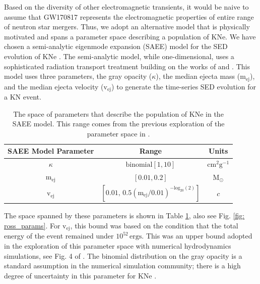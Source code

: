 Based on the diversity of other electromagnetic transients, it would be naive to assume that GW170817 represents the electromagnetic properties of entire range of neutron star mergers. Thus, we adopt an alternative model that is physically motivated and spans a parameter space describing a population of KNe. We have chosen a semi-analytic eigenmode expansion (SAEE) model for the SED evolution of KNe \citep{Rosswog2018}. The semi-analytic model, while one-dimensional, uses a sophisticated radiation transport treatment building on the works of \citet{Wollaeger2017} and \citet{Pinto2000}. This model uses three parameters, the gray opacity ($\kappa$), the median ejecta mass ($\mathrm{m_{ej}}$), and the median ejecta velocity ($\mathrm{v_{ej}}$) to generate the time-series SED evolution for a KN event.
\begin{table}[h!]
  \centering
  \begin{tabular}{c|c|c}
    SAEE Model Parameter & Range & Units \\
    \hline
    $\kappa$ & $\mathrm{binomial}[1, 10]$ & $\mathrm{cm^2 g^{-1}}$ \\
    \hline
    $\mathrm{m_{ej}}$ & $[0.01, 0.2]$ & $\mathrm{M_{\odot}}$ \\
    \hline
    $\mathrm{v_{ej}}$ & $[0.01, \, 0.5 (\mathrm{m_{ej}}/0.01)^{-\mathrm{log}_{20}(2)}]$ & $c$
  \end{tabular}
  \caption{The space of parameters that describe the population of KNe in the SAEE model. This range comes from the previous exploration of the parameter space in \citet{Rosswog2016a}.}
  \label{tab: ross_params}
\end{table}

The space spanned by these parameters is shown in Table \ref{tab: ross_params}, also see Fig. \ref{fig: ross_params}. For $\mathrm{v_{ej}}$, this bound was based on the condition that the total energy of the event remained under $10^{52}\, \mathrm{ergs}$. This was an upper bound adopted in the exploration of this parameter space with numerical hydrodynamics simulations, see Fig. 4 of \citet{Rosswog2016a}. The binomial distribution on the gray opacity is a standard assumption in the numerical simulation community; there is a high degree of uncertainty in this parameter for KNe \citep{Rosswog2018, Kasen2013}.

